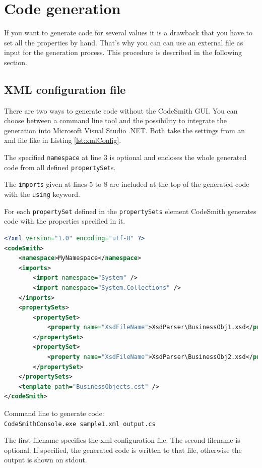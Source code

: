 \section{Code generation}
\label{sec:codeSmithGeneration}

If you want to generate code for several values it is a drawback that you have 
to set all the properties by hand. That's why you can can use an external file 
as input for the generation process. This procedure is described in the 
following section.


\subsection{XML configuration file}
There are two ways to generate code without the CodeSmith GUI. You can choose between 
a command line tool and the possibility to 
integrate the generation into Microsoft Visual Studio .NET. Both take 
the settings from an xml file like in Listing \ref{lst:xmlConfig}. 

The specified \verb~namespace~ at line 3 is optional and encloses the whole 
generated code from all defined \verb~propertySet~s.

The \verb~imports~ given at lines 5 to 8 are included at the top of the generated 
code with the \verb~using~ keyword.

For each \verb~propertySet~ defined in the \verb~propertySets~ element CodeSmith 
generates code with the properties specified in it.

\begin{lstlisting}[float,language=XML,caption=xml configuration,label=lst:xmlConfig]
<?xml version="1.0" encoding="utf-8" ?>
<codeSmith>
	<namespace>MyNamespace</namespace>
	<imports>
		<import namespace="System" />
		<import namespace="System.Collections" />
	</imports>
	<propertySets>
		<propertySet>
			<property name="XsdFileName">XsdParser\BusinessObj1.xsd</property>
		</propertySet>
		<propertySet>
			<property name="XsdFileName">XsdParser\BusinessObj2.xsd</property>
		</propertySet>
	</propertySets>
	<template path="BusinessObjects.cst" />
</codeSmith>
\end{lstlisting}

\noindent Command line to generate code:\\
\indent \verb~CodeSmithConsole.exe sample1.xml output.cs~

\noindent The first filename specifies the xml configuration file. The second filename 
is optional. If specified, the generated code is written to that file, otherwise 
the output is shown on stdout. 

